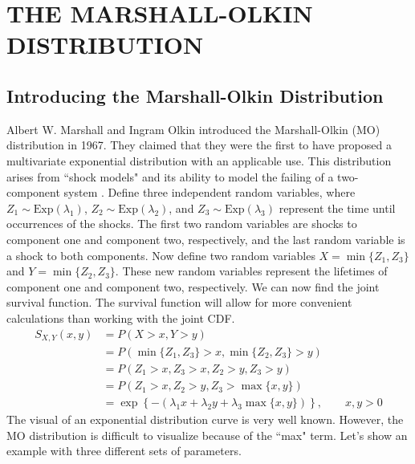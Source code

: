 \chapter{THE MARSHALL-OLKIN DISTRIBUTION}\label{chap:MO}
\section{Introducing the Marshall-Olkin Distribution}
\hspace{24pt} Albert W. Marshall and Ingram Olkin introduced the Marshall-Olkin (MO) distribution in 1967. They claimed that they were the first to have proposed a multivariate exponential distribution with an applicable use. This distribution arises from ``shock models" and its ability to model the failing of a two-component system \cite{marshallolkin1967}. Define three independent random variables, where $Z_1\sim\text{Exp}\left(\lambda_1\right)$, $Z_2\sim\text{Exp}\left(\lambda_2\right)$, and $Z_3\sim\text{Exp}\left(\lambda_3\right)$ represent the time until occurrences of the shocks. The first two random variables are shocks to component one and component two, respectively, and the last random variable is a shock to both components. Now define two random variables $X=\min\{Z_1,Z_3\}$ and $Y=\min\{Z_2,Z_3\}$. These new random variables represent the lifetimes of component one and component two, respectively. We can now find the joint survival function. The survival function will allow for more convenient calculations than working with the joint CDF.
\begin{align*}
    S_{X,Y}\left(x,y\right)&=P\left(X>x,Y>y\right)\\
    &=P\left(\min\{Z_1,Z_3\}>x,\min\{Z_2,Z_3\}>y\right)\\
    &=P\left(Z_1>x,Z_3>x,Z_2>y,Z_3>y\right)\\
    &=P\left(Z_1>x,Z_2>y,Z_3>\max\{x,y\}\right)\\
    &=\exp\left\{-\left(\lambda_1x+\lambda_2y+\lambda_3\max\{x,y\}\right)\right\},\qquad x,y>0
\end{align*}
The visual of an exponential distribution curve is very well known. However, the MO distribution is difficult to visualize because of the ``max" term. Let's show an example with three different sets of parameters.
